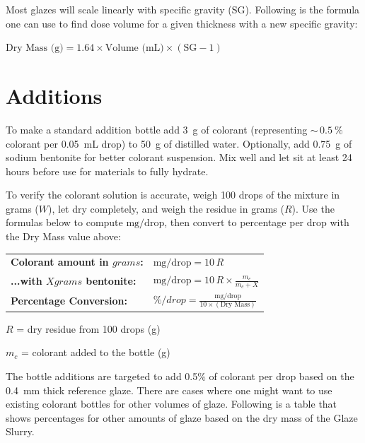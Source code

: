 \documentclass[10pt]{article}
\newcommand{\mgdrop}{\ensuremath{\mathrm{mg/drop}}}
\begin{document}
Most glazes will scale linearly with specific gravity (SG). Following is
the formula one can use to find dose volume for a given thickness with a new
specific gravity:

\begin{center}
	$\text{Dry Mass (g)} = 1.64 \times \text{Volume (mL)} \times (\text{SG} - 1)$
\end{center}

\section*{Additions}

To make a standard addition bottle add \qty{3}{g} of colorant (representing ${\sim}\,\qty{0.5}{\percent}$ colorant
per \qty{0.05}{mL} drop) to \qty{50}{g} of distilled water. Optionally, add \qty{0.75}{g}
of sodium bentonite for better colorant suspension. Mix well and let sit at least 24 hours
before use for materials to fully hydrate.

To verify the colorant solution is accurate, weigh 100 drops of the mixture in grams ($W$),
let dry completely, and weigh the residue in grams ($R$). Use the formulas below to compute
\mgdrop, then convert to percentage per drop with the Dry Mass value above:

\vspace{2pt}
\begin{center}
	\setlength{\arraycolsep}{2pt}
	\renewcommand{\arraystretch}{2.2}
	\begin{tabular}{l l}
		\textbf{Colorant amount in $grams$:}  & $\displaystyle \mgdrop = 10\,R$                                       \\
		\textbf{...with $X grams$ bentonite:} & $\displaystyle \mgdrop = 10\,R \times \frac{m_c}{m_c + X}$            \\
		\textbf{Percentage Conversion:}       & $\displaystyle \%/drop = \frac{\mgdrop}{10 \times (\text{Dry Mass})}$ \\
	\end{tabular}

	\vspace{4pt}
	{\small$R$ = dry residue from 100 drops (\unit{g})\quad}

	{\small$m_c$ = colorant added to the bottle (\unit{g})\quad}
\end{center}

\vspace{4pt}

The bottle additions are targeted to add 0.5\% of colorant per drop based on the
\qty{0.4}{mm} thick reference glaze. There are cases where one might want to use
existing colorant bottles for other volumes of glaze. Following is a table that
shows percentages for other amounts of glaze based on the dry mass of the Glaze
Slurry.
\end{document}
